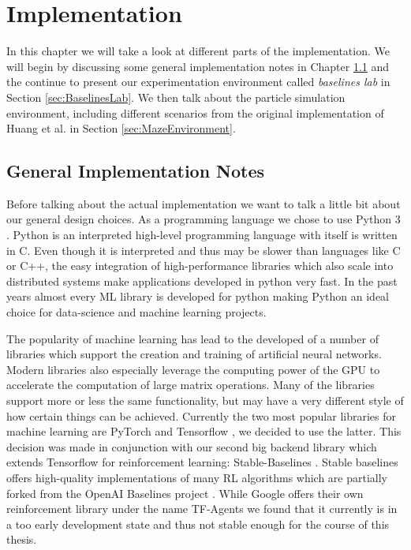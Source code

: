 \chapter{Implementation} \label{chp:Implementation}
In this chapter we will take a look at different parts of the implementation. We will begin by discussing some general implementation notes in Chapter \ref{sec:ImplementationNotes} and the continue to present our experimentation environment called \textit{baselines lab} in Section \ref{sec:BaselinesLab}. We then talk about the particle simulation environment, including different scenarios from the original implementation of Huang et al. in Section \ref{sec:MazeEnvironment}.

\section{General Implementation Notes} \label{sec:ImplementationNotes}
Before talking about the actual implementation we want to talk a little bit about our general design choices. As a programming language we chose to use Python 3 \cite{van2011python, pythonWebsite}. Python is an interpreted high-level programming language with itself is written in C. Even though it is interpreted and thus may be slower than languages like C or C++, the easy integration of high-performance libraries which also scale into distributed systems make applications developed in python very fast. In the past years almost every ML library is developed for python making Python an ideal choice for data-science and machine learning projects.

The popularity of machine learning has lead to the developed of a number of libraries which support the creation and training of artificial neural networks. Modern libraries also especially leverage the computing power of the GPU to accelerate the computation of large matrix operations. Many of the libraries support more or less the same functionality, but may have a very different style of how certain things can be achieved. Currently the two most popular libraries for machine learning are PyTorch \cite{paszke2019pytorch} and Tensorflow \cite{abadi2016tensorflow}, we decided to use the latter. This decision was made in conjunction with our second big backend library which extends Tensorflow for reinforcement learning: Stable-Baselines \cite{stable-baselines}. Stable baselines offers high-quality implementations of many RL algorithms which are partially forked from the OpenAI Baselines project \cite{baselines}. While Google offers their own reinforcement library under the name TF-Agents \cite{TFAgents} we found that it currently is in a too early development state and thus not stable enough for the course of this thesis.

